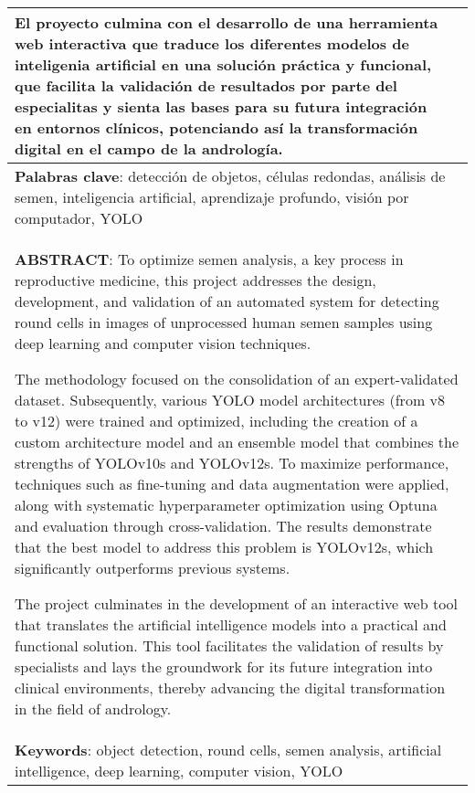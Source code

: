 \begin{longtable}{|l|l|}
{	El proyecto culmina con el desarrollo de una herramienta web interactiva que traduce los diferentes modelos de inteligenia artificial 
	en una solución práctica y funcional, que facilita la validación de resultados por parte del especialitas y sienta las bases para su futura integración en entornos clínicos, potenciando así 
	la transformación digital en el campo de la andrología.} \\ \hline

	\multicolumn{2}{|p{17cm}|}{\textbf{Palabras clave}: detección de objetos, células redondas, 
	análisis de semen, inteligencia artificial, aprendizaje profundo, visión por computador, YOLO}	\\
	\hline

	\multicolumn{2}{|p{17cm}|}{\textbf{ABSTRACT}: To optimize semen analysis, a key process in reproductive medicine, this project addresses the design, 
	development, and validation of an automated system for detecting round cells in images of unprocessed human semen samples using deep learning and 
	computer vision techniques.

	The methodology focused on the consolidation of an expert-validated dataset. Subsequently, various YOLO model architectures (from v8 to v12) were trained 
	and optimized, including the creation of a custom architecture model and an ensemble model that combines the strengths of YOLOv10s and YOLOv12s. 
	To maximize performance, techniques such as fine-tuning and data augmentation were applied, along with systematic hyperparameter optimization using Optuna 
	and evaluation through cross-validation. The results demonstrate that the best model to address this problem is YOLOv12s, which significantly outperforms 
	previous systems.

	The project culminates in the development of an interactive web tool that translates the artificial intelligence models into a practical and 
	functional solution. This tool facilitates the validation of results by specialists and lays the groundwork for its future integration into 
	clinical environments, thereby advancing the digital transformation in the field of andrology.} \\ 
	\hline
	\multicolumn{2}{|p{17cm}|}{\textbf{Keywords}: object detection, round cells, 
	semen analysis, artificial intelligence, deep learning, computer vision, YOLO}	\\ 
	\hline
\end{longtable}